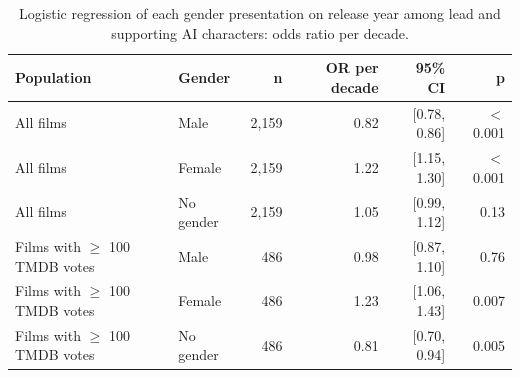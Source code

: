 \begin{table}[htbp]
\centering
\caption{Logistic regression of each gender presentation on release year among lead and supporting AI characters: odds ratio per decade.}
\label{tab:character_gender_trends}
\begin{tabular}{llrrrr}
\toprule
Population & Gender & n & OR per decade & 95\% CI & p \\
\midrule
All films & Male & 2,159 & 0.82 & [0.78, 0.86] & $<$ 0.001 \\
All films & Female & 2,159 & 1.22 & [1.15, 1.30] & $<$ 0.001 \\
All films & No gender & 2,159 & 1.05 & [0.99, 1.12] & 0.13 \\
Films with $\geq$ 100 TMDB votes & Male & 486 & 0.98 & [0.87, 1.10] & 0.76 \\
Films with $\geq$ 100 TMDB votes & Female & 486 & 1.23 & [1.06, 1.43] & 0.007 \\
Films with $\geq$ 100 TMDB votes & No gender & 486 & 0.81 & [0.70, 0.94] & 0.005 \\
\bottomrule
\end{tabular}
\end{table}
